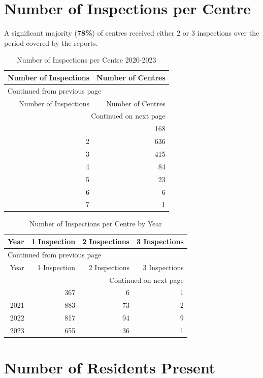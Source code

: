 \documentclass[a4paper,11pt,twoside]{article}
\begin{document}
\section{Number of Inspections per Centre}
\label{sec:org953ae41}
A significant majority (\textbf{78\%}) of centres received either 2 or 3 inspections over the period covered by the reports.

\begin{longtable}{rr}
\caption{Number of Inspections per Centre 2020-2023}
\\[0pt]
Number of Inspections & Number of Centres\\[0pt]
\hline
\endfirsthead
\multicolumn{2}{l}{Continued from previous page} \\[0pt]
\hline

Number of Inspections & Number of Centres \\[0pt]

\hline
\endhead
\hline\multicolumn{2}{r}{Continued on next page} \\
\endfoot
\endlastfoot
\hline
1 & 168\\[0pt]
2 & 636\\[0pt]
3 & 415\\[0pt]
4 & 84\\[0pt]
5 & 23\\[0pt]
6 & 6\\[0pt]
7 & 1\\[0pt]
\end{longtable}

\clearpage
\begin{longtable}{rrrr}
\caption{Number of Inspections per Centre by Year}
\\[0pt]
Year & 1 Inspection & 2 Inspections & 3 Inspections\\[0pt]
\hline
\endfirsthead
\multicolumn{4}{l}{Continued from previous page} \\[0pt]
\hline

Year & 1 Inspection & 2 Inspections & 3 Inspections \\[0pt]

\hline
\endhead
\hline\multicolumn{4}{r}{Continued on next page} \\
\endfoot
\endlastfoot
\hline
2020 & 367 & 6 & 1\\[0pt]
2021 & 883 & 73 & 2\\[0pt]
2022 & 817 & 94 & 9\\[0pt]
2023 & 655 & 36 & 1\\[0pt]
\end{longtable}
\section{Number of Residents Present}
\label{sec:org6f0886d}
\end{document}
